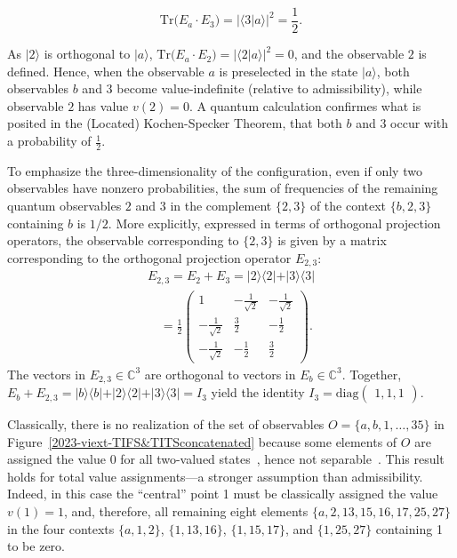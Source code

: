 \documentclass[%
 superscriptaddress,
  preprint,
 showpacs,
 showkeys,
 nofootinbib,
  amsmath,amssymb,
 pra,
  longbibliography,
  floatfix,
 ]{revtex4-2}
\theoremstyle{definition}
\newcommand{\C}{\mathbb{C}}
\begin{document}
\begin{equation*}
\text{Tr}\big(E_a \cdot E_3 \big) = \vert \langle 3 \vert a \rangle \vert^2 = \frac12.
\end{equation*}

As $\vert 2 \rangle$ is orthogonal to $\vert a \rangle$,
$\text{Tr}\big(E_a \cdot E_2 \big) = \vert \langle 2 \vert a \rangle \vert^2 = 0$,
and the observable $2$ is defined.
Hence, when the observable $a$ is preselected in the state $\vert a \rangle$, both observables $b$ and $3$ become value-indefinite (relative to admissibility),
while observable $2$ has value  $v(2) = 0$.
A quantum calculation confirmes what is posited in the (Located) Kochen-Specker Theorem,
that both $b$ and $3$ occur with a probability of $\frac12$.


To emphasize the three-dimensionality of the configuration, even if only two observables have nonzero probabilities,  the sum of frequencies of the remaining quantum observables $2$ and $3$
 in the complement  $\{2,3\}$ of the context $\{b,2,3\}$ containing $b$ is $1/2$.
More explicitly, expressed in terms of orthogonal projection operators, the observable corresponding to $\{2,3\}$
is given by a  matrix  corresponding to the orthogonal projection operator $E_{2,3}$:
\begin{equation}
\begin{split}
E_{2,3}=E_2 + E_3 = \vert 2 \rangle \langle 2 \vert + \vert 3 \rangle \langle 3 \vert \\
\quad = \frac12
\begin{pmatrix}
1 & -\frac1{\sqrt{2}}& -\frac1{\sqrt{2}}\\
-\frac1{\sqrt{2}}& \frac32& -\frac12\\
-\frac1{\sqrt{2}}& -\frac12& \frac32
\end{pmatrix}
.
\end{split}
\label{2023-viext-sumotopo}
\end{equation}
The vectors in $E_{2,3}\in \C^3$ are orthogonal to vectors in  $E_{b}\in \C^3$.
Together, $E_b+E_{2,3} =\vert b \rangle \langle b \vert +\vert 2 \rangle \langle 2 \vert + \vert 3 \rangle \langle 3 \vert =I_3$ yield
the identity $I_3=\text{diag}\begin{pmatrix}1,1,1\end{pmatrix}$.

Classically, there is no realization of the set of observables $O=\{ a, b, 1,\ldots , 35\}$ in Figure~\ref{2023-viext-TIFS&TITSconcatenated} because
some elements of $O$ are assigned the value $0$ for all two-valued states~\cite[Table~24.1]{Svozil-2018-p}, hence
not separable~\cite[Theorem~0]{kochen1}.  This result holds for total value assignments---a stronger assumption than admissibility.
Indeed, in this case  the ``central'' point 1 must be classically assigned the value $v(1)=1$,
and, therefore, all remaining eight elements
$\{a, 2, 13, 15, 16, 17, 25, 27\}$
in the four contexts
$\{a,1,2\}$, $\{1,13,16\}$, $\{1,15,17\}$, and $\{1,25,27\}$ containing 1 to be zero.
\end{document}
